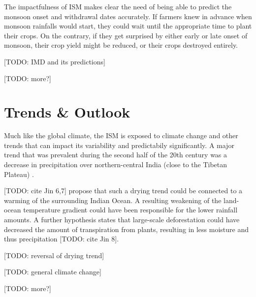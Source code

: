 The impactfulness of ISM makes clear the need of being able to predict the monsoon onset and withdrawal dates accurately. If farmers knew in advance when monsoon rainfalls would start, they could wait until the appropriate time to plant their crops. On the contrary, if they get surprised by either early or late onset of monsoon, their crop yield might be reduced, or their crops destroyed entirely.

[TODO: IMD and its predictions]

[TODO: more?]

\section{Trends \& Outlook}
\label{st:ism_trends}

Much like the global climate, the ISM is exposed to climate change and other trends that can impact its variability and predictabily significantly. A major trend that was prevalent during the second half of the 20th century was a decrease in precipitation over northern-central India (close to the Tibetan Plateau) \citep{Jin.2017}.

[TODO: cite Jin 6,7] propose that such a drying trend could be connected to a warming of the surrounding Indian Ocean. A resulting weakening of the land-ocean temperature gradient could have been responsible for the lower rainfall amounts. A further hypothesis states that large-scale deforestation could have decreased the amount of transpiration from plants, resulting in less moisture and thus precipitation [TODO: cite Jin 8].

[TODO: reversal of drying trend]

[TODO: general climate change]

[TODO: more?]





